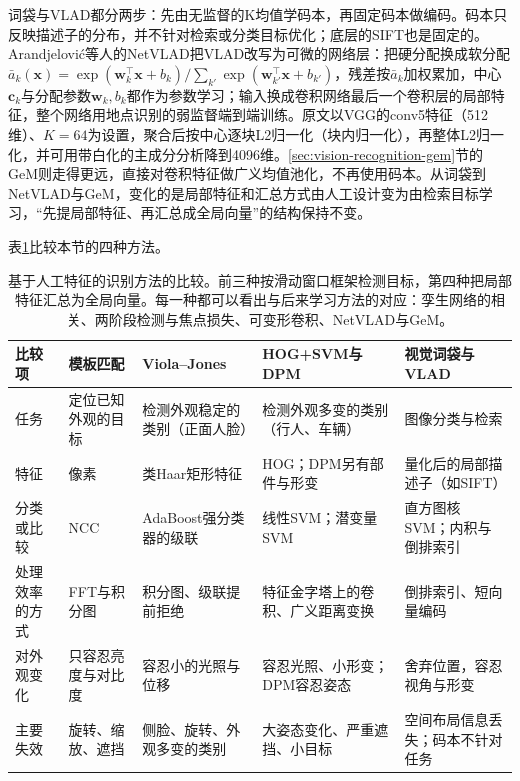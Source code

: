 词袋与VLAD都分两步：先由无监督的K均值学码本，再固定码本做编码。码本只反映描述子的分布，并不针对检索或分类目标优化；底层的SIFT也是固定的。Arandjelović等人的NetVLAD把VLAD改写为可微的网络层：把硬分配换成软分配$\bar a_k(\bm x)=\exp(\bm w_k^{\top}\bm x+b_k)/\sum_{k'}\exp(\bm w_{k'}^{\top}\bm x+b_{k'})$，残差按$\bar a_k$加权累加，中心$\bm c_k$与分配参数$\bm w_k,b_k$都作为参数学习；输入换成卷积网络最后一个卷积层的局部特征，整个网络用地点识别的弱监督端到端训练。原文以VGG的conv5特征（512维）、$K=64$为设置，聚合后按中心逐块L2归一化（块内归一化），再整体L2归一化，并可用带白化的主成分分析降到4096维。\ref{sec:vision-recognition-gem}节的GeM则走得更远，直接对卷积特征做广义均值池化，不再使用码本。从词袋到NetVLAD与GeM，变化的是局部特征和汇总方式由人工设计变为由检索目标学习，“先提局部特征、再汇总成全局向量”的结构保持不变。

表\ref{tab:vision-features-recognition-compare}比较本节的四种方法。

\begin{table}[tbp]
  \centering
  \small
  \begin{tabularx}{\linewidth}{@{}lXXXX@{}}
    \toprule
    比较项 & 模板匹配 & Viola–Jones & HOG+SVM与DPM & 视觉词袋与VLAD \\
    \midrule
    任务 & 定位已知外观的目标 & 检测外观稳定的类别（正面人脸） & 检测外观多变的类别（行人、车辆） & 图像分类与检索 \\
    特征 & 像素 & 类Haar矩形特征 & HOG；DPM另有部件与形变 & 量化后的局部描述子（如SIFT） \\
    分类或比较 & NCC & AdaBoost强分类器的级联 & 线性SVM；潜变量SVM & 直方图核SVM；内积与倒排索引 \\
    处理效率的方式 & FFT与积分图 & 积分图、级联提前拒绝 & 特征金字塔上的卷积、广义距离变换 & 倒排索引、短向量编码 \\
    对外观变化 & 只容忍亮度与对比度 & 容忍小的光照与位移 & 容忍光照、小形变；DPM容忍姿态 & 舍弃位置，容忍视角与形变 \\
    主要失效 & 旋转、缩放、遮挡 & 侧脸、旋转、外观多变的类别 & 大姿态变化、严重遮挡、小目标 & 空间布局信息丢失；码本不针对任务 \\
    \bottomrule
  \end{tabularx}
  \caption{基于人工特征的识别方法的比较。前三种按滑动窗口框架检测目标，第四种把局部特征汇总为全局向量。每一种都可以看出与后来学习方法的对应：孪生网络的相关、两阶段检测与焦点损失、可变形卷积、NetVLAD与GeM。}
  \label{tab:vision-features-recognition-compare}
\end{table}


